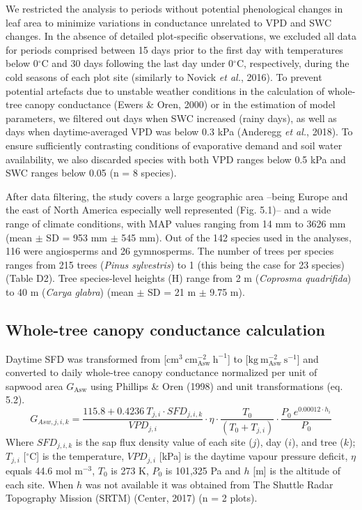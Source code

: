 \documentclass[11pt,twoside]{reedthesis}
\begin{document}
We restricted the analysis to periods without potential phenological
changes in leaf area to minimize variations in conductance unrelated to
VPD and SWC changes. In the absence of detailed plot-specific
observations, we excluded all data for periods comprised between 15 days
prior to the first day with temperatures below 0\(^{\circ}\)C and 30
days following the last day under 0\(^{\circ}\)C, respectively, during
the cold seasons of each plot site (similarly to Novick \emph{et al.},
2016). To prevent potential artefacts due to unstable weather conditions
in the calculation of whole-tree canopy conductance (Ewers \& Oren,
2000) or in the estimation of model parameters, we filtered out days
when SWC increased (rainy days), as well as days when daytime-averaged
VPD was below 0.3 kPa (Anderegg \emph{et al.}, 2018). To ensure
sufficiently contrasting conditions of evaporative demand and soil water
availability, we also discarded species with both VPD ranges below 0.5
kPa and SWC ranges below 0.05 (n = 8 species).\par

After data filtering, the study covers a large geographic area --being
Europe and the east of North America especially well represented (Fig.
5.1)-- and a wide range of climate conditions, with MAP values ranging
from 14 mm to 3626 mm (mean \(\pm\) SD = 953 mm \(\pm\) 545 mm). Out of
the 142 species used in the analyses, 116 were angiosperms and 26
gymnosperms. The number of trees per species ranges from 215 trees
(\emph{Pinus sylvestris}) to 1 (this being the case for 23 species)
(Table D2). Tree species-level heights (H) range from 2 m
(\emph{Coprosma quadrifida}) to 40 m (\emph{Carya glabra}) (mean \(\pm\)
SD = 21 m \(\pm\) 9.75 m).\par

\subsection{Whole-tree canopy conductance
calculation}\label{whole-tree-canopy-conductance-calculation}

Daytime SFD was transformed from
{[}\(\text{cm}^3 \: \text{cm}_{\text{Asw}}^{-2} \: \text{h}^{-1}\){]} to
{[}\(\text{kg} \: \text{m}_{\text{Asw}}^{-2} \: \text{s}^{-1}\){]} and
converted to daily whole-tree canopy conductance normalized per unit of
sapwood area \(G_{\text{Asw}}\) using Phillips \& Oren (1998) and unit
transformations (eq. 5.2).
\begin{equation}
G_{Asw,j,i,k} = \frac{115.8 + 0.4236 \: T_{j , i} \cdot SFD_{j , i , k}}{VPD_{j,i}}\cdot \eta \cdot \frac{T_0}{(T_0 + T_{j,i})} \cdot \frac{P_0 \: e^{0.00012 \cdot h_i}}{P_0}
\end{equation}
Where \(SFD_{j,i,k}\) is the sap flux density value of each site
(\(j\)), day (\(i\)), and tree (\(k\)); \({T}_{j,i}\)
{[}\(^{\circ}\)C{]} is the temperature, \(VPD_{j,i}\) {[}kPa{]} is the
daytime vapour pressure deficit, \(\eta\) equals 44.6 mol
\(\text{m}^{-3}\), \(T_0\) is 273 K, \(P_0\) is 101,325 Pa and \(h\)
{[}m{]} is the altitude of each site. When \(h\) was not available it
was obtained from The Shuttle Radar Topography Mission (SRTM) (Center,
2017) (n = 2 plots).\par
\end{document}
